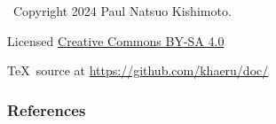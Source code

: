 \documentclass[12pt,aspectratio=169]{beamer}
\begin{document}
\begin{frame}[c,plain]
  \vfill
  {\centering \Huge {}}

  \vfill
  \textcopyright\ Copyright 2024 Paul Natsuo Kishimoto.

  Licensed \href{https://creativecommons.org/licenses/by-sa/4.0/}{Creative Commons BY-SA 4.0}

  \TeX\ source at \url{https://github.com/khaeru/doc/}
\end{frame}

\appendix

\begin{frame}
\frametitle{References}

\nocite{de-weck-roos-magee-2011}

\printbibliography[heading=none]

\end{frame}
\end{document}
